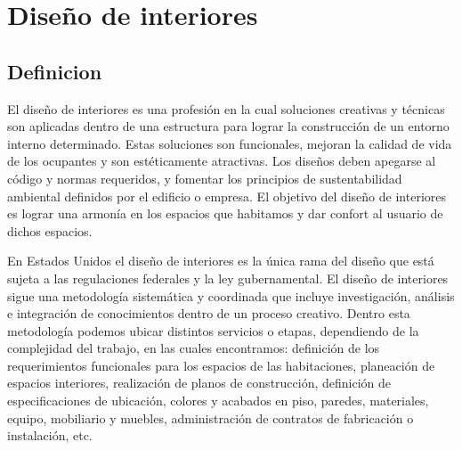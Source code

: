 \section{Diseño de interiores}
\subsection{Definicion}
El diseño de interiores es una profesión en la cual soluciones creativas y técnicas son aplicadas dentro de una estructura para lograr la construcción de un entorno interno determinado. Estas soluciones son funcionales, mejoran la calidad de vida de los ocupantes y son estéticamente atractivas. Los diseños deben apegarse al código y normas requeridos, y fomentar los principios de sustentabilidad ambiental definidos por el edificio o empresa. El objetivo del diseño de interiores es lograr una armonía en los espacios que habitamos y dar confort al usuario de dichos espacios\cite{B01}. \par
En Estados Unidos el diseño de interiores es la única rama del diseño que está sujeta a las regulaciones federales y la ley gubernamental\cite{B02}.
El diseño de interiores sigue una metodología sistemática y coordinada que incluye investigación, análisis e integración de conocimientos dentro de un proceso creativo. Dentro esta metodología podemos ubicar distintos servicios o etapas, dependiendo de la complejidad del trabajo, en las cuales encontramos: definición de los requerimientos funcionales para los espacios de las habitaciones, planeación de espacios interiores, realización de planos de construcción, definición de especificaciones de ubicación, colores y acabados en piso, paredes, materiales, equipo, mobiliario y muebles, administración de contratos de fabricación o instalación, etc.\par


